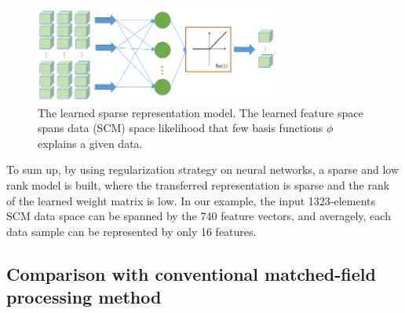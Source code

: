 \begin{figure}
\includegraphics[width=8cm]{figure/sparse_represention_model}
\caption{The learned sparse representation model. The learned feature space spans data (SCM) space likelihood that few basis functions $\phi$ explains a given data.}
\end{figure}
To sum up, by using regularization strategy on neural networks, a sparse and low rank model is built, where the transferred representation is sparse and the rank of the learned weight matrix is low. In our example, the input 1323-elements SCM data space can be spanned by the 740 feature vectors, and averagely, each data sample can be represented by only 16 features.

\subsection{Comparison with conventional matched-field processing method}

